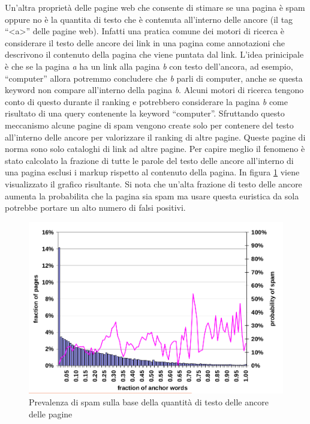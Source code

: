 Un'altra proprietà delle pagine web che consente di stimare se una pagina è spam oppure no è la quantita di testo che è contenuta all'interno delle ancore (il tag ``<a>'' delle pagine web). Infatti una pratica comune dei motori di ricerca è considerare il testo delle ancore dei link in una pagina come annotazioni che descrivono il contenuto della pagina che viene puntata dal link. L'idea prinicipale è che se la pagina \textit{a} ha un link alla pagina \textit{b} con testo dell'ancora, ad esempio, ``computer'' allora potremmo concludere che \textit{b} parli di computer, anche se questa keyword non compare all'interno della pagina \textit{b}. Alcuni motori di ricerca tengono conto di questo durante il ranking e potrebbero considerare la pagina \textit{b} come risultato di una query contenente la keyword ``computer''. Sfruttando questo meccanismo alcune pagine di spam vengono create solo per contenere del testo all'interno delle  ancore per valorizzare il ranking di altre pagine. Queste pagine di norma sono solo cataloghi di link ad altre pagine. Per capire meglio il fenomeno è stato calcolato la frazione di tutte le parole del testo delle ancore all'interno di una pagina esclusi i markup rispetto al contenuto della pagina. In figura \ref{fig:fetterly6} viene visualizzato il grafico risultante. Si nota che un'alta frazione di testo delle ancore aumenta la probabilita che la pagina sia spam ma usare questa euristica da sola potrebbe portare un alto numero di falsi positivi.
\begin{figure}[htbp]
\centering
\includegraphics[width=12cm]{immagini/fetterly/fetterly6}
\caption{Prevalenza di spam sulla base della quantità di testo delle ancore delle pagine}
\label{fig:fetterly6}
\end{figure}

